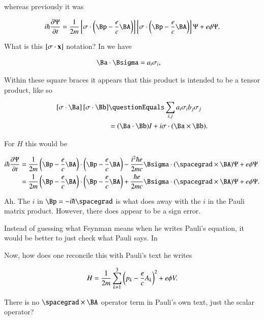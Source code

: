 whereas previously it was

\begin{align*}
i \hbar \PD{t}{\Psi} = \inv{2m} 
\left[\sigma \cdot \left( \Bp - \frac{e}{c} \BA \right)\right]
\left[\sigma \cdot \left( \Bp - \frac{e}{c} \BA \right)\right]
 \Psi + e \phi \Psi.
\end{align*}

What is this $[\sigma \cdot \mathbf{x}]$ notation?  In \citep{wiki:pauli} we have

\begin{align*}
\Ba \cdot \Bsigma &= a_i \sigma_i,
\end{align*}

Within these square braces it appears that this product is intended to be a tensor product, like so

\begin{align*}
\left[\sigma \cdot \Ba\right]
\left[\sigma \cdot \Bb\right] 
&\questionEquals \sum_{i,j} a_i \sigma_i b_j \sigma_j \\
&= (\Ba \cdot \Bb) I + i \sigma \cdot (\Ba \cross \Bb).
\end{align*}

For $H$ this would be

\begin{align*}
i \hbar \PD{t}{\Psi} 
&= \inv{2m} 
\left( \Bp - \frac{e}{c} \BA \right) \cdot \left( \Bp - \frac{e}{c} \BA \right)
- \frac{i^2 \hbar e}{2m c} \Bsigma \cdot (\spacegrad \cross \BA) \Psi + e \phi \Psi \\
&= \inv{2m} 
\left( \Bp - \frac{e}{c} \BA \right) \cdot \left( \Bp - \frac{e}{c} \BA \right)
+ \frac{\hbar e}{2m c} \Bsigma \cdot (\spacegrad \cross \BA) \Psi + e \phi \Psi.
\end{align*}

Ah.  The $i$ in $\Bp = -i \hbar \spacegrad$ is what does away with the $i$ in the Pauli matrix product.  However, there does appear to be a sign error.

Instead of guessing what Feynman means when he writes Pauli's equation, it would be better to just check what Pauli says.  In 

Now, how does one reconcile this with Pauli's text \citep{pauli2000wm} he writes

\begin{align*}
H = \frac{1}{2m} \sum_{k=1}^3 \left( p_k - \frac{e}{c}A_k \right)^2 + e \phi V.
\end{align*}

There is no $\spacegrad \cross \BA$ operator term in Pauli's own text, just the scalar operator?

